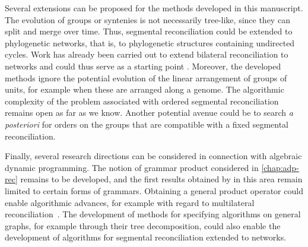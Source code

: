 Several extensions can be proposed for the methods developed in this manuscript.
The evolution of groups or syntenies is not necessarily tree-like, since they can split and merge over time.
Thus, segmental reconciliation could be extended to phylogenetic networks, that is, to phylogenetic structures containing undirected cycles.
Work has already been carried out to extend bilateral reconciliation to networks and could thus serve as a starting point \parencite{Chan2024EfficientAlgorithmReconciliation}.
Moreover, the developed methods ignore the potential evolution of the linear arrangement of groups of units, for example when these are arranged along a genome.
The algorithmic complexity of the problem associated with ordered segmental reconciliation remains open as far as we know.
Another potential avenue could be to search \emph{a posteriori} for orders on the groups that are compatible with a fixed segmental reconciliation.

Finally, several research directions can be considered in connection with algebraic dynamic programming.
The notion of grammar product considered in \cref{chap:adp-rec} remains to be developed, and the first results obtained by \textcite{Siederdissen2015ProductGrammarsAlignment} in this area remain limited to certain forms of grammars.
Obtaining a general product operator could enable algorithmic advances, for example with regard to multilateral reconciliation~\parencite{Menet2022PhylogeneticReconciliation}.
The development of methods for specifying algorithms on general graphs, for example through their tree decomposition, could also enable the development of algorithms for segmental reconciliation extended to networks.
